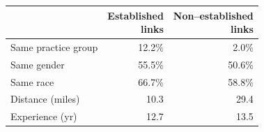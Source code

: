 
\begin{tabular}{lrr}
\toprule
  & \shortstack[r]{Established \\ links} & \shortstack[r]{Non--established \\ links}\\
\midrule
Same practice group & 12.2\% & 2.0\%\\
Same gender & 55.5\% & 50.6\%\\
Same race & 66.7\% & 58.8\%\\
Distance (miles) & 10.3 & 29.4\\
Experience (yr) & 12.7 & 13.5\\
\bottomrule
\end{tabular}
